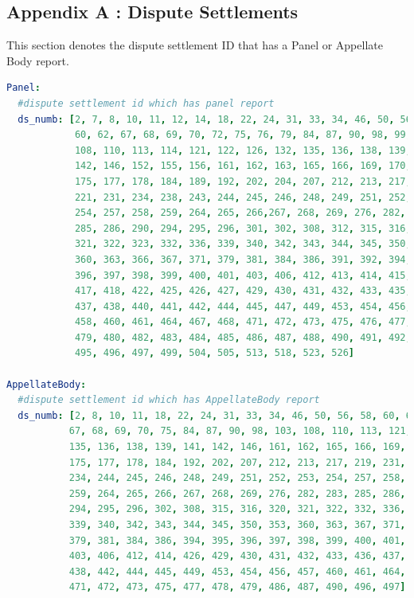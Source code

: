 \documentclass[sigconf]{acmart}
\begin{document}
\begin{appendices}
\section*{Appendix A : Dispute Settlements}
This section denotes the dispute settlement ID that has a Panel or Appellate Body report.
\begin{lstlisting}[breaklines, language=yaml, frame=tlrb]
Panel:
  #dispute settlement id which has panel report
  ds_numb: [2, 7, 8, 10, 11, 12, 14, 18, 22, 24, 31, 33, 34, 46, 50, 56, 58,
            60, 62, 67, 68, 69, 70, 72, 75, 76, 79, 84, 87, 90, 98, 99, 103,
            108, 110, 113, 114, 121, 122, 126, 132, 135, 136, 138, 139, 141,
            142, 146, 152, 155, 156, 161, 162, 163, 165, 166, 169, 170, 174,
            175, 177, 178, 184, 189, 192, 202, 204, 207, 212, 213, 217, 219,
            221, 231, 234, 238, 243, 244, 245, 246, 248, 249, 251, 252, 253,
            254, 257, 258, 259, 264, 265, 266,267, 268, 269, 276, 282, 283,
            285, 286, 290, 294, 295, 296, 301, 302, 308, 312, 315, 316, 320,
            321, 322, 323, 332, 336, 339, 340, 342, 343, 344, 345, 350, 353,
            360, 363, 366, 367, 371, 379, 381, 384, 386, 391, 392, 394, 395,
            396, 397, 398, 399, 400, 401, 403, 406, 412, 413, 414, 415, 416,
            417, 418, 422, 425, 426, 427, 429, 430, 431, 432, 433, 435, 436,
            437, 438, 440, 441, 442, 444, 445, 447, 449, 453, 454, 456, 457,
            458, 460, 461, 464, 467, 468, 471, 472, 473, 475, 476, 477, 478,
            479, 480, 482, 483, 484, 485, 486, 487, 488, 490, 491, 492, 493,
            495, 496, 497, 499, 504, 505, 513, 518, 523, 526]

AppellateBody:
  #dispute settlement id which has AppellateBody report
  ds_numb: [2, 8, 10, 11, 18, 22, 24, 31, 33, 34, 46, 50, 56, 58, 60, 62,
           67, 68, 69, 70, 75, 84, 87, 90, 98, 103, 108, 110, 113, 121, 122,
           135, 136, 138, 139, 141, 142, 146, 161, 162, 165, 166, 169, 170,
           175, 177, 178, 184, 192, 202, 207, 212, 213, 217, 219, 231,
           234, 244, 245, 246, 248, 249, 251, 252, 253, 254, 257, 258,
           259, 264, 265, 266, 267, 268, 269, 276, 282, 283, 285, 286,
           294, 295, 296, 302, 308, 315, 316, 320, 321, 322, 332, 336,
           339, 340, 342, 343, 344, 345, 350, 353, 360, 363, 367, 371,
           379, 381, 384, 386, 394, 395, 396, 397, 398, 399, 400, 401,
           403, 406, 412, 414, 426, 429, 430, 431, 432, 433, 436, 437,
           438, 442, 444, 445, 449, 453, 454, 456, 457, 460, 461, 464,
           471, 472, 473, 475, 477, 478, 479, 486, 487, 490, 496, 497]


\end{lstlisting}
\end{appendices}
\end{document}
